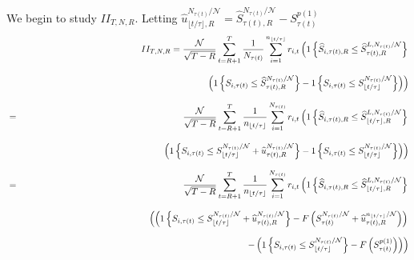 {\small We begin to study $II_{T,N,R}.$ Letting }$\widehat{u}_{\lfloor
t/\tau \rfloor ,R}^{N_{\tau(t)}/\mathcal{N}}=\widehat{S}%
_{\tau(t),R}^{N_{\tau(t)}/\mathcal{N}%
}-S_{\tau(t)}^{p(1)}$%
\begin{eqnarray*}
&&II_{T,N,R}=\frac{\mathcal{N}}{\sqrt{T-R}}\sum_{t=R+1}^{T}\frac{1}{%
N_{\tau(t)}}\sum_{i=1}^{n_{\lfloor t/\tau \rfloor
}}r_{i,t}\left( 1\left\{ \widehat{S}_{i,\tau(t),R}\leq 
\widehat{S}_{\tau(t),R}^{L,N_{\tau(t)}/%
\mathcal{N}}\right\} \right.  \\
&&\phantom{\frac{\mathcal{N}}{\sqrt{T-R}}\sum_{t=R+1}^{T}\frac{1}{n_{\lfloor
t/\tau \rfloor }}\sum_{i=1}^{N_{\tau(t)}}r_{i,t}\left(
\right.}\left. \left( 1\left\{ S_{i,\tau(t)}\leq \widehat{S}%
_{\tau(t),R}^{N_{\tau(t)}/\mathcal{N}%
}\right\} -1\left\{ S_{i,\tau(t)}\leq S_{\lfloor t/\tau
\rfloor }^{N_{\tau(t)}/\mathcal{N}}\right\} \right) \right) 
\\
&=&\frac{\mathcal{N}}{\sqrt{T-R}}\sum_{t=R+1}^{T}\frac{1}{n_{\lfloor t/\tau
\rfloor }}\sum_{i=1}^{N_{\tau(t)}}r_{i,t}\left( 1\left\{ 
\widehat{S}_{i,\tau(t),R}\leq \widehat{S}_{\lfloor t/\tau
\rfloor ,R}^{L,N_{\tau(t)}/\mathcal{N}}\right\} \right.  \\
&&\phantom{\frac{\mathcal{N}}{\sqrt{T-R}}\sum_{t=R+1}^{T}\frac{1}{n_{\lfloor
t/\tau \rfloor }}\sum_{i=1}^{N_{\tau(t)}}r_{i,t}\left(
\right.}\left. \left( 1\left\{ S_{i,\tau(t)}\leq S_{\lfloor
t/\tau \rfloor }^{N_{\tau(t)}/\mathcal{N}}+\widehat{u}%
_{\tau(t),R}^{N_{\tau(t)}/\mathcal{N}%
}\right\} -1\left\{ S_{i,\tau(t)}\leq S_{\lfloor t/\tau
\rfloor }^{N_{\tau(t)}/\mathcal{N}}\right\} \right) \right) 
\\
&=&\frac{\mathcal{N}}{\sqrt{T-R}}\sum_{t=R+1}^{T}\frac{1}{n_{\lfloor t/\tau
\rfloor }}\sum_{i=1}^{N_{\tau(t)}}r_{i,t}\left( 1\left\{ 
\widehat{S}_{i,\tau(t),R}\leq \widehat{S}_{\lfloor t/\tau
\rfloor ,R}^{L,N_{\tau(t)}/\mathcal{N}}\right\} \right.  \\
&&\phantom{\frac{\mathcal{N}}{\sqrt{T-R}}\sum_{t=R+1}^{T}\frac{1}{n_{\lfloor
t/\tau \rfloor }}\sum_{i=1}^{N_{\tau(t)}}r_{i,t}\left(
\right.}\left( \left( 1\left\{ S_{i,\tau(t)}\leq S_{\lfloor
t/\tau \rfloor }^{N_{\tau(t)}/\mathcal{N}}+\widehat{u}%
_{\tau(t),R}^{N_{\tau(t)}/\mathcal{N}%
}\right\} -F\left( S_{\tau(t)}^{N_{\tau(t)}/%
\mathcal{N}}+\widehat{u}_{\tau(t),R}^{n_{\lfloor t/\tau
\rfloor }/\mathcal{N}}\right) \right) \right.  \\
&&\left. -\left( 1\left\{ S_{i,\tau(t)}\leq S_{\lfloor
t/\tau \rfloor }^{N_{\tau(t)}/\mathcal{N}}\right\} -F\left(
S_{\tau(t)}^{p(1)}\right)
\right) \right)  \\

\end{eqnarray*}
